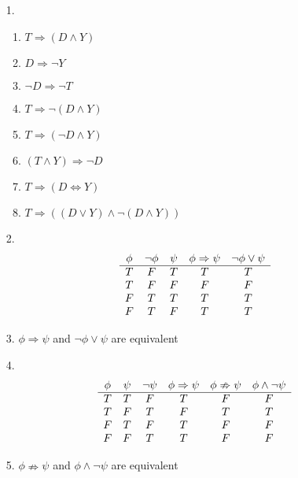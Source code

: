 \documentclass[11pt]{exam}
\author{@dantevangelista}
\begin{document}

\begin{enumerate}[leftmargin=0pt]

\item[1.]
\begin{enumerate}[label=(\alph*)]
    \item $T \Rightarrow (D \land Y)$
    \item $D \Rightarrow \neg Y$
    \item $\neg D \Rightarrow \neg T$
    \item $T \Rightarrow \neg(D \land Y)$
    \item $T \Rightarrow (\neg D \land Y)$
    \item $(T \land Y) \Rightarrow \neg D$
    \item $T \Rightarrow (D \Leftrightarrow Y)$
    \item $T \Rightarrow ((D \lor Y) \land \neg(D \land Y))$
\end{enumerate}

\item[2.]
\begin{displaymath}
\begin{array}{c c c c c}
\phi & \neg \phi & \psi & \phi \Rightarrow \psi & \neg \phi \lor \psi \\
\hline
T & F & T & T & T \\
T & F & F & F & F \\
F & T & T & T & T \\
F & T & F & T & T \\
\end{array}
\end{displaymath}

\item[3.] $\phi \Rightarrow \psi$ and $\neg \phi \lor \psi$ are equivalent

\item[4.]
\begin{displaymath}
\begin{array}{c c c c c c}
\phi & \psi & \neg \psi & \phi \Rightarrow \psi & \phi \nRightarrow \psi & \phi \land \neg \psi \\
\hline
T & T & F & T & F & F \\
T & F & T & F & T & T\\
F & T & F & T & F & F\\
F & F & T & T & F & F\\
\end{array}
\end{displaymath}

\item[5.] $\phi \nRightarrow \psi$ and $\phi \land \neg \psi$ are equivalent

\end{enumerate}
\end{document}
